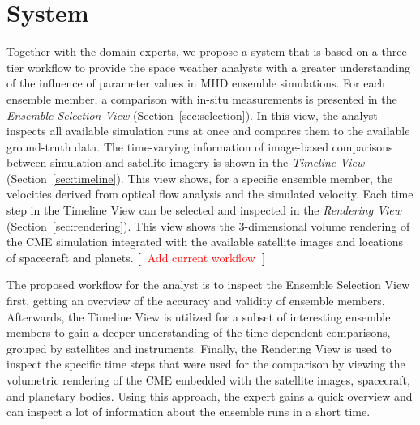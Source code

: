 \documentclass[journal]{vgtc}                %
\newcommand{\todo}[1] {\textbf{[~}\textcolor {red}{#1}\marginpar{\textcolor {red}{\centerline{{\Huge \textbf{!}}}}}\textbf{~]}}
\newcommand{\todo}[1] {\textbf{[~}\textcolor {red}{#1}\marginpar{\textcolor {red}{\centerline{{\Huge \textbf{!}}}}}\textbf{~]}}
\begin{document}

\section{System}
Together with the domain experts, we propose a system that is based on a three-tier workflow to provide the space weather analysts with a greater understanding of the influence of parameter values in MHD ensemble simulations. For each ensemble member, a comparison with in-situ measurements is presented in the \emph{Ensemble Selection View} (Section~\ref{sec:selection}). In this view, the analyst inspects all available simulation runs at once and compares them to the available ground-truth data. The time-varying information of image-based comparisons between simulation and satellite imagery is shown in the \emph{Timeline View} (Section~\ref{sec:timeline}). This view shows, for a specific ensemble member, the velocities derived from optical flow analysis and the simulated velocity. Each time step in the Timeline View can be selected and inspected in the \emph{Rendering View} (Section~\ref{sec:rendering}). This view shows the 3-dimensional volume rendering of the CME simulation integrated with the available satellite images and locations of spacecraft and planets. \todo{Add current workflow}

The proposed workflow for the analyst is to inspect the Ensemble Selection View first, getting an overview of the accuracy and validity of ensemble members. Afterwards, the Timeline View is utilized for a subset of interesting ensemble members to gain a deeper understanding of the time-dependent comparisons, grouped by satellites and instruments. Finally, the Rendering View is used to inspect the specific time steps that were used for the comparison by viewing the volumetric rendering of the CME embedded with the satellite images, spacecraft, and planetary bodies. Using this approach, the expert gains a quick overview and can inspect a lot of information about the ensemble runs in a short time.
\end{document}
